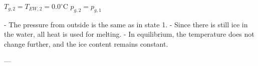 \( T_{g,2} = T_{EW,2} = 0.0^\circ \text{C} \)  
\( p_{g,2} = p_{g,1} \)  

- The pressure from outside is the same as in state 1.  
- Since there is still ice in the water, all heat is used for melting.  
- In equilibrium, the temperature does not change further, and the ice content remains constant.  

---